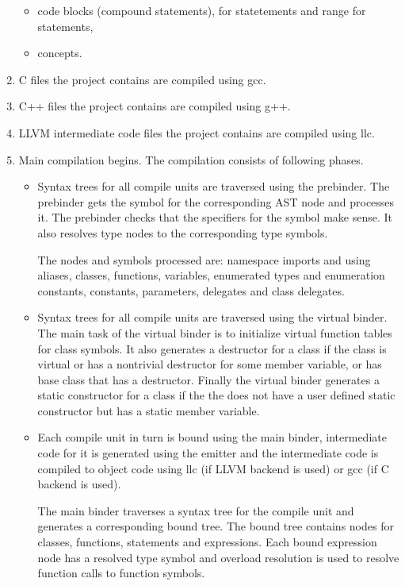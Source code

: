 \documentclass[oneside, a4paper, 11pt]{article}
\begin{document}
\begin{enumerate}
\begin{itemize}
\item
code blocks (compound statements), for statetements and range for statements,

\item
concepts.

\end{itemize}

\item
C files the project contains are compiled using gcc.

\item
C++ files the project contains are compiled using g++.

\item
LLVM intermediate code files the project contains are compiled using llc.

\item
Main compilation begins. The compilation consists of following phases.

\begin{itemize}

\item
Syntax trees for all compile units are traversed using the prebinder.
The prebinder gets the symbol for the corresponding AST node and
processes it.
The prebinder checks that the specifiers for the symbol make sense.
It also resolves type nodes to the corresponding type symbols.

The nodes and symbols processed are:
namespace imports and using aliases, classes, functions, variables, enumerated types
and enumeration constants, constants, parameters, delegates and class delegates.

\item
Syntax trees for all compile units are traversed using the virtual binder.
The main task of the virtual binder is to initialize virtual function tables for
class symbols.
It also generates a destructor for a class if the class is virtual or has a nontrivial
destructor for some member variable, or has base class that has a destructor.
Finally the virtual binder generates a static constructor for a class if the
the does not have a user defined static constructor but has a static member variable.

\item
Each compile unit in turn is bound using the main binder,
intermediate code for it is generated using the emitter and
the intermediate code is compiled to object code using llc (if LLVM backend is used)
or gcc (if C backend is used).

The main binder traverses a syntax tree for the compile unit and generates
a corresponding bound tree.
The bound tree contains nodes for classes, functions, statements and expressions.
Each bound expression node has a resolved type symbol and
overload resolution is used to resolve function calls to function symbols.


\end{itemize}
\end{enumerate}
\end{document}
